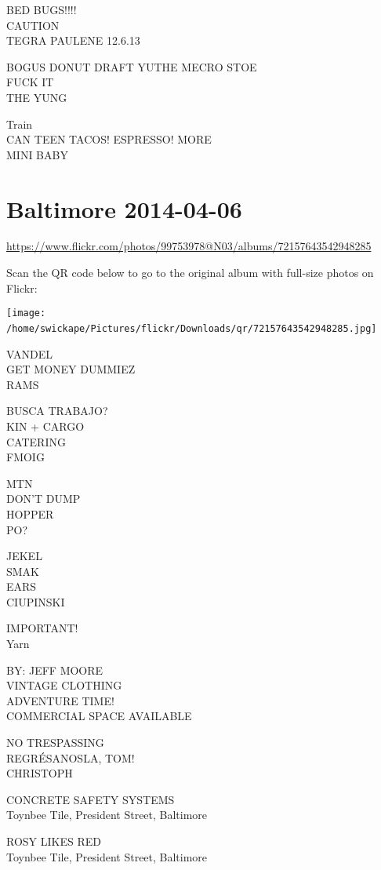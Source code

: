 \documentclass[10pt,letterpaper]{article}
\begin{document}
BED BUGS!!!!\\
CAUTION\\
TEGRA PAULENE 12.6.13

BOGUS DONUT DRAFT YUTHE MECRO STOE\\
FUCK IT\\
THE YUNG

Train\\
CAN TEEN TACOS! ESPRESSO! MORE\\
MINI BABY
\

\section*{Baltimore 2014-04-06}

\url{https://www.flickr.com/photos/99753978@N03/albums/72157643542948285}

Scan the QR code below to go to the original album with full-size photos on Flickr:

\texttt{[image: /home/swickape/Pictures/flickr/Downloads/qr/72157643542948285.jpg]}
\

VANDEL\\
GET MONEY DUMMIEZ\\
RAMS

BUSCA TRABAJO?\\
KIN + CARGO\\
CATERING\\
FMOIG

MTN\\
DON'T DUMP\\
HOPPER\\
PO?

JEKEL\\
SMAK\\
EARS\\
CIUPINSKI

IMPORTANT!\\
Yarn

BY: JEFF MOORE\\
VINTAGE CLOTHING\\
ADVENTURE TIME!\\
COMMERCIAL SPACE AVAILABLE

NO TRESPASSING\\
REGRÉSANOSLA, TOM!\\
CHRISTOPH

CONCRETE SAFETY SYSTEMS\\
Toynbee Tile, President Street, Baltimore

ROSY LIKES RED\\
Toynbee Tile, President Street, Baltimore
\end{document}
